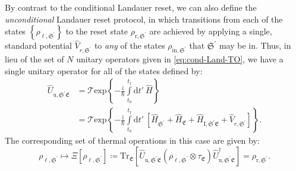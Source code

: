 \documentclass[preprints,article,accept,moreauthors,pdftex]{Definitions/mdpi}
\begin{document}
\begin{paracol}{2}
By contrast to the conditional Landauer reset, we can also define the \emph{unconditional} Landauer reset protocol, in which transitions from each of the states $\left\{\rho_{\ell,\mathfrak{S}^{\prime}}\right\}$ to the reset state $\rho_{\mathrm{r},\mathfrak{S}^{\prime}}$ are achieved by applying a single, standard potential $\widehat{V}_{r,\mathfrak{S}^{\prime}}$ to \emph{any} of the states $\rho_{\mathrm{in},\mathfrak{S}^{\prime}}$ that $\mathfrak{S}^{\prime}$ may be in. Thus, in lieu of the set of $N$ unitary operators given in \eqref{eq:cond-Land-TO}, we have a single unitary operator for all of the states defined by:
\begin{equation}
    \label{eq:uncond-Land-U}
    \begin{split}
        \widehat{U}_{\mathrm{u},\mathfrak{S^\prime E}} &= \mathcal{T} \mathrm{exp} \left\{-\frac{\mathrm{i}}{\hbar}\int \limits_{t_{0}}^{t_\mathrm{f}} \mathrm{d}t'\:\widehat{H} \right\} \\[4pt]
        &= \mathcal{T} \mathrm{exp} \left\{-\frac{\mathrm{i}}{\hbar}\int \limits_{t_{0}}^{t_\mathrm{f}} \mathrm{d}t'\: \left[\widehat{H}_{\mathfrak{S}^{\prime}} + \widehat{H}_{\mathfrak{E}} + \widehat{H}_{\mathrm{I}, \mathfrak{S^\prime E}} + \widehat{V}_{r,\mathfrak{S}^{\prime}}\right] \right\}.
    \end{split}
\end{equation}
The corresponding set of thermal operations in this case are given by:
\begin{equation}
    \label{eq:uncond-Land-TO}
    \rho_{\ell,\mathfrak{S}^{\prime}} \mapsto \Xi\left[\rho_{\ell,\mathfrak{S}^{\prime}}\right] \coloneqq \mathrm{Tr}_{\mathfrak{E}} \left[ \widehat{U}_{\mathrm{u},\mathfrak{S^\prime E}} \left( \rho_{\ell,\mathfrak{S}^{\prime}} \otimes \tau_{\mathfrak{E}} \right) \widehat{U}_{\mathrm{u},\mathfrak{S^\prime E}}^{\dagger} \right] = \rho_{\mathrm{r},\mathfrak{S}^{\prime}}.
\end{equation}


\end{paracol}
\end{document}
